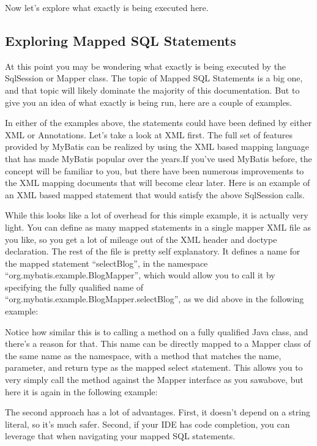 

Now let's explore what exactly is being executed here.
\subsection{Exploring Mapped SQL Statements}
At this point you may be wondering what exactly is being executed by the SqlSession or Mapper class. The topic of Mapped SQL Statements is a big one, and that topic will likely dominate the majority of this documentation. But to give you an idea of what exactly is being run, here are a couple of examples.

In either of the examples above, the statements could have been defined by either XML or Annotations. Let's take a look at XML first. The full set of features provided by MyBatis can be realized by using the XML based mapping language that has made MyBatis popular over the years.If you've used MyBatis before, the concept will be familiar to you, but there have been numerous improvements to the XML mapping documents that will become clear later. Here is an example of an XML based mapped statement that would satisfy the above SqlSession calls.



While this looks like a lot of overhead for this simple example, it is actually very light. You can define as many mapped statements in a single mapper XML file as you like, so you get a lot of mileage out of the XML header and doctype declaration. The rest of the file is pretty self explanatory. It defines a name for the mapped statement “selectBlog”, in the namespace “org.mybatis.example.BlogMapper”, which would allow you to call it by specifying the fully qualified name of “org.mybatis.example.BlogMapper.selectBlog”, as we did above in the following example:



Notice how similar this is to calling a method on a fully qualified Java class, and there's a reason for that. This name can be directly mapped to a Mapper class of the same name as the namespace, with a method that matches the name, parameter, and return type as the mapped select statement. This allows you to very simply call the method against the Mapper interface as you sawabove, but here it is again in the following example:



The second approach has a lot of advantages. First, it doesn't depend on a string literal, so it's much safer. Second, if your IDE has code completion, you can leverage that when navigating your mapped SQL statements.

